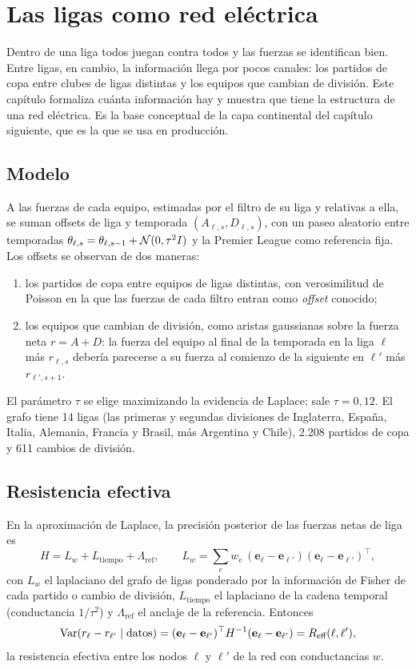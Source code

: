 \chapter{Las ligas como red eléctrica}
\label{cap:red}

Dentro de una liga todos juegan contra todos y las fuerzas se identifican bien. Entre ligas, en cambio, la información llega por pocos canales: los partidos de copa entre clubes de ligas distintas y los equipos que cambian de división. Este capítulo formaliza cuánta información hay y muestra que tiene la estructura de una red eléctrica. Es la base conceptual de la capa continental del capítulo siguiente, que es la que se usa en producción.

\section{Modelo}

A las fuerzas de cada equipo, estimadas por el filtro de su liga y relativas a ella, se suman offsets de liga y temporada $(A_{\ell,s},D_{\ell,s})$, con un paseo aleatorio entre temporadas $\theta_{\ell,s}=\theta_{\ell,s-1}+\mathcal{N}(0,\tau^2I)$ y la Premier League como referencia fija. Los offsets se observan de dos maneras:
\begin{enumerate}[label=(\alph*)]
\item los partidos de copa entre equipos de ligas distintas, con verosimilitud de Poisson en la que las fuerzas de cada filtro entran como \emph{offset} conocido;
\item los equipos que cambian de división, como aristas gaussianas sobre la fuerza neta $r=A+D$: la fuerza del equipo al final de la temporada en la liga $\ell$ más $r_{\ell,s}$ debería parecerse a su fuerza al comienzo de la siguiente en $\ell'$ más $r_{\ell',s+1}$.
\end{enumerate}
El parámetro $\tau$ se elige maximizando la evidencia de Laplace; sale $\tau=0{,}12$. El grafo tiene 14 ligas (las primeras y segundas divisiones de Inglaterra, España, Italia, Alemania, Francia y Brasil, más Argentina y Chile), 2.208 partidos de copa y 611 cambios de división.

\section{Resistencia efectiva}

\begin{proposicion} \dem
En la aproximación de Laplace, la precisión posterior de las fuerzas netas de liga es
\[
H=L_w+L_\text{tiempo}+\Lambda_\text{ref},\qquad L_w=\sum_e w_e\,(\mathbf e_\ell-\mathbf e_{\ell'})(\mathbf e_\ell-\mathbf e_{\ell'})^\top,
\]
con $L_w$ el laplaciano del grafo de ligas ponderado por la información de Fisher de cada partido o cambio de división, $L_\text{tiempo}$ el laplaciano de la cadena temporal (conductancia $1/\tau^2$) y $\Lambda_\text{ref}$ el anclaje de la referencia. Entonces
\[
\operatorname{Var}(r_\ell-r_{\ell'}\mid\text{datos})=(\mathbf e_\ell-\mathbf e_{\ell'})^\top H^{-1}(\mathbf e_\ell-\mathbf e_{\ell'})=R_\text{eff}(\ell,\ell'),
\]
la resistencia efectiva entre los nodos $\ell$ y $\ell'$ de la red con conductancias $w$.
\end{proposicion}

